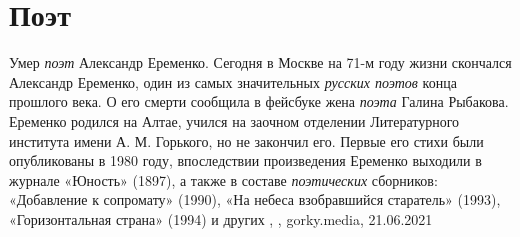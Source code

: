  
 
 
 
 
\chapter{Поэт}
\label{sec:slova.poet}

Умер \emph{поэт} Александр Еременко.  Сегодня в Москве на 71-м году жизни
скончался Александр Еременко, один из самых значительных \emph{русских поэтов}
конца прошлого века. О его смерти сообщила в фейсбуке жена \emph{поэта} Галина
Рыбакова.  Еременко родился на Алтае, учился на заочном отделении Литературного
института имени А.  М. Горького, но не закончил его. Первые его стихи были
опубликованы в 1980 году, впоследствии произведения Еременко выходили в журнале
«Юность» (1897), а также в составе \emph{поэтических} сборников: «Добавление к
сопромату» (1990), «На небеса взобравшийся старатель» (1993), «Горизонтальная
страна» (1994) и других
, 
, gorky.media, 21.06.2021

